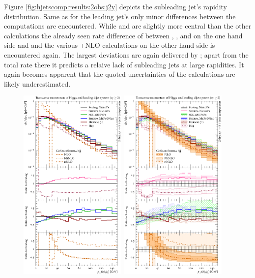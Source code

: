 Figure \ref{fig:hjetscomp:results:2obs:j2y} depicts the subleading jet's 
rapidity distribution. Same as for the leading jet's only minor differences 
between the computations are encountered. While \Sherpa \NNLOPS and \MGaMC 
are slightly more central than the other calculations the already seen 
rate difference of between \Powheg \NNLOPS, \MGaMC, \Herwig and \Sherpa 
\MEPSatNLO on the one hand side and \Sherpa \NNLOPS and the various 
\GoSam{}+\Sherpa NLO calculations on the other hand side is encountered 
again. The largest deviations are again delivered by \Hej; apart from the 
total rate there it predicts a relaive lack of subleading jets at large 
rapidities. It again becomes apparent that the quoted uncertainties of the 
\NNLOPS calculations are likely underestimated.

\begin{figure}[t!]
  \centering
  \includegraphics[width=0.47\textwidth]{figures/hjetscomp_u_Hjj_pT_incl.pdf}
  \hfill
  \includegraphics[width=0.47\textwidth]{figures/hjetscomp_Hjj_pT_incl.pdf}

\end{figure}
